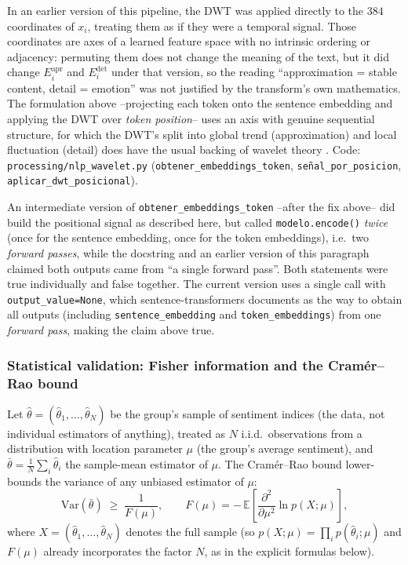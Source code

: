 \documentclass[11pt,a4paper,oneside]{article}
\theoremstyle{definition}
\begin{document}
\begin{implBox}[title=Design fix]
In an earlier version of this pipeline, the DWT was applied directly to the $384$ coordinates of
$x_i$, treating them as if they were a temporal signal. Those coordinates are axes of a learned
feature space with no intrinsic ordering or adjacency: permuting them does not change the
meaning of the text, but it did change $E^{\mathrm{apr}}_i$ and $E^{\mathrm{det}}_i$ under that
version, so the reading ``approximation = stable content, detail = emotion'' was not justified
by the transform's own mathematics. The formulation above --projecting each token onto the
sentence embedding and applying the DWT over \emph{token position}-- uses an axis with genuine
sequential structure, for which the DWT's split into global trend (approximation) and local
fluctuation (detail) does have the usual backing of wavelet theory \cite{Mallat1989}. Code:
\texttt{processing/nlp\_wavelet.py} (\texttt{obtener\_embeddings\_token},
\texttt{se\~nal\_por\_posicion}, \texttt{aplicar\_dwt\_posicional}).

An intermediate version of \texttt{obtener\_embeddings\_token} --after the fix above-- did build
the positional signal as described here, but called \texttt{modelo.encode()} \emph{twice} (once
for the sentence embedding, once for the token embeddings), i.e.\ two \emph{forward passes},
while the docstring and an earlier version of this paragraph claimed both outputs came from ``a
single forward pass''. Both statements were true individually and false together. The current
version uses a single call with \texttt{output\_value=None}, which sentence-transformers
documents as the way to obtain all outputs (including \texttt{sentence\_embedding} and
\texttt{token\_embeddings}) from one \emph{forward pass}, making the claim above true.
\end{implBox}

\subsubsection{Statistical validation: Fisher information and the Cram\'er--Rao bound}
\label{sec:crb}

Let $\hat\theta = (\hat\theta_1,\ldots,\hat\theta_N)$ be the group's sample of sentiment indices
(the data, not individual estimators of anything), treated as $N$ i.i.d.\ observations from a
distribution with location parameter $\mu$ (the group's average sentiment), and
$\bar\theta = \frac1N\sum_i \hat\theta_i$ the sample-mean estimator of $\mu$. The Cram\'er--Rao
bound \cite{Fisher1922,Rao1945,Cramer1946} lower-bounds the variance of any unbiased estimator of
$\mu$:
\[
\mathrm{Var}(\bar\theta) \;\ge\; \frac{1}{F(\mu)},
\qquad
F(\mu) = -\,\mathbb{E}\!\left[\frac{\partial^2}{\partial\mu^2}\ln p(X;\mu)\right],
\]
where $X=(\hat\theta_1,\ldots,\hat\theta_N)$ denotes the full sample (so
$p(X;\mu)=\prod_i p(\hat\theta_i;\mu)$ and $F(\mu)$ already incorporates the factor $N$, as in
the explicit formulas below).
\end{document}
